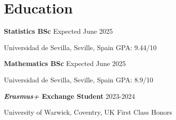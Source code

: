 \renewcommand{\subsection}[3]{
    \noindent\textbf{#1}  \emph{#2} \hfill #3 \break
}

\section{Education}
\subsection{Statistics BSc}{}{Expected June 2025}
Universidad de Sevilla, Seville, Spain \hfill GPA: 9.44/10

\subsection{Mathematics BSc}{}{Expected June 2025}
Universidad de Sevilla, Seville, Spain \hfill GPA: 8.9/10

\subsection{\textit{Erasmus+} Exchange Student}{}{2023-2024}
University of Warwick, Coventry, UK \hfill First Class Honors

\vspace{0.2em}